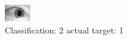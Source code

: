 \begin{figure}[h!]
\begin{center}
\includegraphics[width=0.60\columnwidth]{figures/ID1554_class_2_target_1.png}
\end{center}
\caption{ Classification: 2 actual target: 1}
\label{fig:ID1554_class_2_target_1}
\end{figure}
